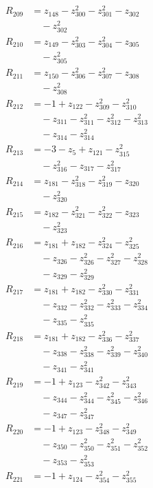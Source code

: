 \begin{align*}
R_{209} &= z_{148} -z_{300}^{2} -z_{301}^{2} -z_{302} \\
&\quad -z_{302}^{2} \\
R_{210} &= z_{149} -z_{303}^{2} -z_{304}^{2} -z_{305} \\
&\quad -z_{305}^{2} \\
R_{211} &= z_{150} -z_{306}^{2} -z_{307}^{2} -z_{308} \\
&\quad -z_{308}^{2} \\
R_{212} &= -1 +z_{122} -z_{309}^{2} -z_{310}^{2} \\
&\quad -z_{311} -z_{311}^{2} -z_{312}^{2} -z_{313}^{2} \\
&\quad -z_{314} -z_{314}^{2} \\
R_{213} &= -3 -z_{5} +z_{121} -z_{315}^{2} \\
&\quad -z_{316}^{2} -z_{317} -z_{317}^{2} \\
R_{214} &= z_{181} -z_{318}^{2} -z_{319}^{2} -z_{320} \\
&\quad -z_{320}^{2} \\
R_{215} &= z_{182} -z_{321}^{2} -z_{322}^{2} -z_{323} \\
&\quad -z_{323}^{2} \\
R_{216} &= z_{181} +z_{182} -z_{324}^{2} -z_{325}^{2} \\
&\quad -z_{326} -z_{326}^{2} -z_{327}^{2} -z_{328}^{2} \\
&\quad -z_{329} -z_{329}^{2} \\
R_{217} &= z_{181} +z_{182} -z_{330}^{2} -z_{331}^{2} \\
&\quad -z_{332} -z_{332}^{2} -z_{333}^{2} -z_{334}^{2} \\
&\quad -z_{335} -z_{335}^{2} \\
R_{218} &= z_{181} +z_{182} -z_{336}^{2} -z_{337}^{2} \\
&\quad -z_{338} -z_{338}^{2} -z_{339}^{2} -z_{340}^{2} \\
&\quad -z_{341} -z_{341}^{2} \\
R_{219} &= -1 +z_{123} -z_{342}^{2} -z_{343}^{2} \\
&\quad -z_{344} -z_{344}^{2} -z_{345}^{2} -z_{346}^{2} \\
&\quad -z_{347} -z_{347}^{2} \\
R_{220} &= -1 +z_{123} -z_{348}^{2} -z_{349}^{2} \\
&\quad -z_{350} -z_{350}^{2} -z_{351}^{2} -z_{352}^{2} \\
&\quad -z_{353} -z_{353}^{2} \\
R_{221} &= -1 +z_{124} -z_{354}^{2} -z_{355}^{2} \\

\end{align*}
